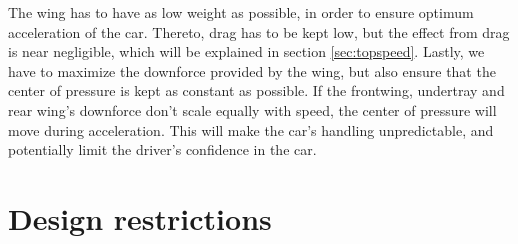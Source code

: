 The wing has to have as low weight as possible, in order to ensure optimum acceleration of the car. Thereto, drag has to be kept low, but the effect from drag is near negligible, which will be explained in section \ref{sec:topspeed}. Lastly, we have to maximize the downforce provided by the wing, but also ensure that the center of pressure is kept as constant as possible. If the frontwing, undertray and rear wing's downforce don't scale equally with speed, the center of pressure will move during acceleration. This will make the car's handling unpredictable, and potentially limit the driver's confidence in the car.

\section{Design restrictions} %
